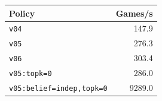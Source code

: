 \begin{tabular}{lr}
\toprule
Policy & Games/s \\
\midrule
\texttt{v04} & 147.9 \\
\texttt{v05} & 276.3 \\
\texttt{v06} & 303.4 \\
\texttt{v05:topk=0} & 286.0 \\
\texttt{v05:belief=indep,topk=0} & 9289.0 \\
\bottomrule
\end{tabular}

